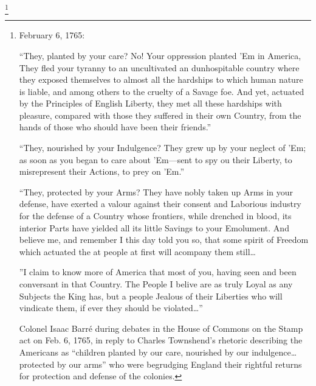 \begin{quotation}\end{quotation}

\begin{quotation}\end{quotation}




\footnote{
  February 6, 1765:

  ``They, planted by your care? No! Your oppression planted 'Em in America,
  They fled your tyranny to an uncultivated an dunhospitable country where they
  exposed themselves to almost all the hardships to which human nature is
  liable, and among others to the cruelty of a Savage foe. And yet, actuated by
  the Principles of English Liberty, they met all these hardships with pleasure,
  compared with those they suffered in their own Country, from the hands of
  those who should have been their friends.''

  ``They, nourished by your Indulgence? They grew up by your neglect of 'Em; as
  soon as you began to care about 'Em---sent to spy ou their Liberty, to
  misrepresent their Actions, to prey on 'Em.''

  ``They, protected by your Arms? They have nobly taken up Arms in your defense,
  have exerted a valour against their consent and Laborious industry for the
  defense of a Country whose frontiers, while drenched in blood, its interior
  Parts have yielded all its little Savings to your Emolument. And believe me,
  and remember I this day told you so, that some spirit of Freedom which
  actuated the at people at first will acompany them still\ldots
  
  ''I claim to know more of America that most of you, having seen and been
  conversant in that Country. The People I belive are as truly Loyal as any
  Subjects the King has, but a people Jealous of their Liberties who will
  vindicate them, if ever they should be violated\ldots''
  
  Colonel Isaac Barr\'e during debates in the House of Commons on the Stamp act
  on Feb. 6, 1765, in reply to Charles Townshend's rhetoric describing the
  Americans as ``children planted by our care, nourished by our indulgence\ldots
  protected by our arms'' who were begrudging England their rightful returns for
  protection and defense of the colonies.\cite[p. 67]{cook_long_1995}
} 

